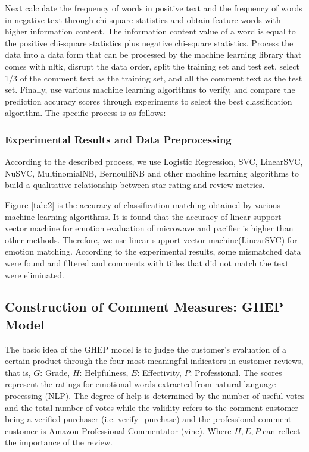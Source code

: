 \documentclass{mcmthesis}
\newcommand{\upcite}[1]{\textsuperscript{\textsuperscript{\cite{#1}}}}
\begin{document}
Next calculate the frequency of words in positive text and the frequency of words in negative text through chi-square statistics and obtain feature words with higher information content. The information content value of a word is equal to the positive chi-square statistics plus negative chi-square statistics\upcite{5}. Process the data into a data form that can be processed by the machine learning library that comes with nltk, disrupt the data order, split the training set and test set, select 1/3 of the comment text as the training set, and all the comment text as the test set\upcite{6}. Finally, use various machine learning algorithms to verify, and compare the prediction accuracy scores through experiments to select the best classification algorithm. The specific process is as follows:

\subsubsection{Experimental Results and Data Preprocessing}
According to the described process, we use Logistic Regression, SVC, LinearSVC, NuSVC, MultinomialNB, BernoulliNB and other machine learning algorithms to build a qualitative relationship\upcite{7} between star rating and review metrics.

Figure \ref{tab:2} is the accuracy of classification matching obtained by various machine learning algorithms. It is found that the accuracy of linear support vector machine for emotion evaluation of microwave and pacifier is higher than other methods. Therefore, we use linear support vector machine(LinearSVC) for emotion matching. According to the experimental results, some mismatched data were found and filtered and comments with titles\upcite{8} that did not match the text were eliminated.
\subsection{Construction of Comment Measures: GHEP Model}
The basic idea of the GHEP model is to judge the customer's evaluation of a certain product through the four most meaningful indicators in customer reviews, that is, $ G $: Grade, $ H $: Helpfulness, $ E $: Effectivity, $ P $: Professional. The scores represent the ratings for emotional words extracted from natural language processing (NLP). The degree of help is determined by the number of useful votes and the total number of votes while the validity refers to the comment customer being a verified purchaser (i.e. verify\_purchase) and the professional comment customer is Amazon Professional Commentator (vine). Where $ H,E,P $ can reflect the importance of the review.
\end{document}
